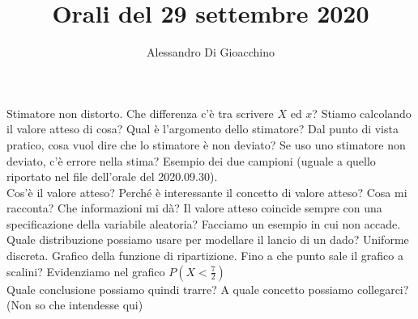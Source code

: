 \documentclass{article}
\title{Orali del 29 settembre 2020}
\author{Alessandro Di Gioacchino}
\begin{document}
    \maketitle
    
    Stimatore non distorto. Che differenza c'è tra scrivere $ X $ ed $ x $? Stiamo calcolando il valore atteso di cosa? Qual è l'argomento dello stimatore? Dal punto di vista
    pratico, cosa vuol dire che lo stimatore è non deviato? Se uso uno stimatore non deviato, c'è errore nella stima? Esempio dei due campioni (uguale a quello riportato
    nel file dell'orale del 2020.09.30). \\
    Cos'è il valore atteso? Perché è interessante il concetto di valore atteso? Cosa mi racconta? Che informazioni mi dà? Il valore atteso coincide sempre con una
    specificazione della variabile aleatoria? Facciamo un esempio in cui non accade. \\
    Quale distribuzione possiamo usare per modellare il lancio di un dado? Uniforme discreta. Grafico della funzione di ripartizione. Fino a che punto sale il grafico a
    scalini? Evidenziamo nel grafico $ P ( X < \frac{ 7 }{ 2 }) $ \\
    Quale conclusione possiamo quindi trarre? A quale concetto possiamo collegarci? (Non so che intendesse qui) \\
    
\end{document}

